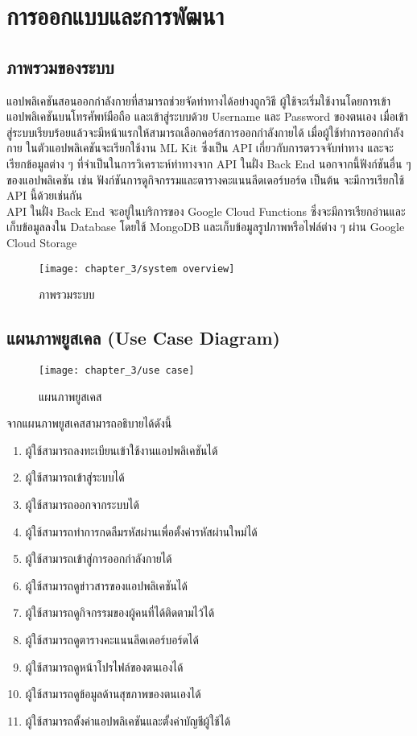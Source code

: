 \chapter{การออกแบบและการพัฒนา}

\section{ภาพรวมของระบบ}

แอปพลิเคชันสอนออกกำลังกายที่สามารถช่วยจัดท่าทางได้อย่างถูกวิธี ผู้ใช้จะเริ่มใช้งานโดยการเข้าแอปพลิเคชันบนโทรศัพท์มือถือ และเข้าสู่ระบบด้วย Username และ Password ของตนเอง เมื่อเข้าสู่ระบบเรียบร้อยแล้วจะมีหน้าแรกให้สามารถเลือกคอร์สการออกกำลังกายได้ เมื่อผู้ใช้ทำการออกกำลังกาย ในตัวแอปพลิเคชันจะเรียกใช้งาน ML Kit ซึ่งเป็น API  เกี่ยวกับการตรวจจับท่าทาง และจะเรียกข้อมูลต่าง ๆ ที่จำเป็นในการวิเคราะห์ท่าทางจาก API ในฝั่ง Back End นอกจากนี้ฟังก์ชันอื่น ๆ ของแอปพลิเคชัน เช่น ฟังก์ชันการดูกิจกรรมและตารางคะแนนลีดเดอร์บอร์ด เป็นต้น จะมีการเรียกใช้ API นี้ด้วยเช่นกัน
\\\indent
API ในฝั่ง Back End จะอยู่ในบริการของ Google Cloud Functions ซึ่งจะมีการเรียกอ่านและเก็บข้อมูลลงใน Database โดยใช้ MongoDB และเก็บข้อมูลรูปภาพหรือไฟล์ต่าง ๆ ผ่าน Google Cloud Storage
\begin{figure}
    \texttt{[image: chapter\_3/system overview]}
    \caption{ภาพรวมระบบ}
\end{figure}

\section{แผนภาพยูสเคล (Use Case Diagram)}
\begin{figure}
    \texttt{[image: chapter\_3/use case]}
    \caption{แผนภาพยูสเคส}
\end{figure}
จากแผนภาพยูสเคสสามารถอธิบายได้ดังนี้
\begin{enumerate}
    \item ผู้ใช้สามารถลงทะเบียนเข้าใช้งานแอปพลิเคชันได้
    \item ผู้ใช้สามารถเข้าสู่ระบบได้
    \item ผู้ใช้สามารถออกจากระบบได้
    \item ผู้ใช้สามารถทำการกดลืมรหัสผ่านเพื่อตั้งค่ารหัสผ่านใหม่ได้
    \item ผู้ใช้สามารถเข้าสู่การออกกำลังกายได้
    \item ผู้ใช้สามารถดูข่าวสารของแอปพลิเคชันได้
    \item ผู้ใช้สามารถดูกิจกรรมของผู้คนที่ได้ติดตามไว้ได้
    \item ผู้ใช้สามารถดูตารางคะแนนลีดเดอร์บอร์ดได้
    \item ผู้ใช้สามารถดูหน้าโปรไฟล์ของตนเองได้
    \item ผู้ใช้สามารถดูข้อมูลด้านสุขภาพของตนเองได้
    \item ผู้ใช้สามารถตั้งค่าแอปพลิเคชันและตั้งค่าบัญชีผู้ใช้ได้
\end{enumerate}
\clearpage

